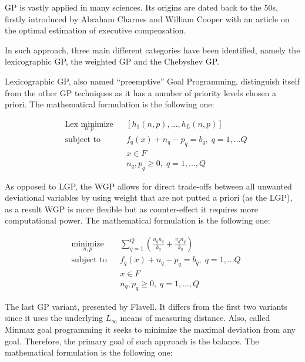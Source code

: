 \begin{doublespace}
GP is vastly applied in many sciences\cite{Tamiz1998}. Its origins are dated back to the 50s, firstly introduced by Abraham Charnes and William Cooper\cite{Charnes1955} with an article on the optimal estimation of executive compensation.

In such approach, three main different categories have been identified, namely the lexicographic GP, the weighted GP and the Chebyshev GP.

Lexicographic GP, also named “preemptive” Goal Programming, distinguish itself from the other GP techniques as it has a number of priority levels chosen a priori. The mathematical formulation is the following one:

\begin{equation*}
\begin{aligned}
& \underset{n,p}{\text{Lex minimize}}
& & [h_1(n,p),...,h_L(n,p)] \\
& \text{subject to}
& & f_q(x)+n_q-p_q=b_q, \; q=1,...Q \\
& & & x\in F \\
& & & n_q,p_q\geq 0, \; q=1,...,Q 
\end{aligned}
\end{equation*}

As opposed to LGP, the WGP allows for direct trade-offs between all unwanted deviational variables by using weight that are not putted a priori (as the LGP), as a result WGP is more flexible but as counter-effect it requires more computational power. The mathematical formulation is the following one:

\begin{equation*}
\begin{aligned}
& \underset{n,p}{\text{minimize}}
& & \sum_{q=1}^{Q}(\frac{u_q n_q}{k_q}+\frac{v_q n_q}{k_q}) \\
& \text{subject to}
& & f_q(x)+n_q-p_q=b_q, \; q=1,...Q \\
& & & x\in F \\
& & & n_q,p_q\geq 0, \; q=1,...,Q 
\end{aligned}
\end{equation*}

The last GP variant, presented by Flavell. It differs from the first two variants since it uses the underlying $ L_\infty $ means of measuring distance. Also, called Minmax goal programming it seeks to minimize the maximal deviation from any goal. Therefore, the primary goal of such approach is the balance. The mathematical formulation is the following one:


\end{doublespace}

